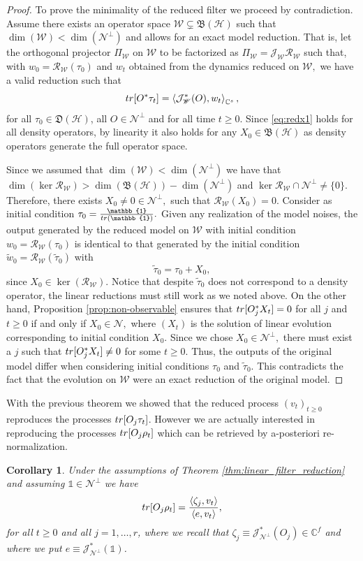 \documentclass[aihp,12pt]{imsart}
\newcommand{\Hc}{\mathcal{H}}
\newcommand{\Jc}{\mathcal{J}}
\newcommand{\Rc}{\mathcal{R}}
\newcommand{\Ns}{\mathscr{N}}
\newcommand{\Ws}{\mathscr{W}}
\newcommand{\Rs}{\mathscr{R}}
\newcommand{\Cb}{\mathbb{C}}
\newcommand{\Bf}{\mathfrak{B}}
\newcommand{\Df}{\mathfrak{D}}
\newcommand{\one}{\mathbb{1}}
\newcommand{\tr}{{\rm tr}}
\newcommand{\inner}[2]{\left< #1,#2 \right>}
\theoremstyle{theorem}
\newtheorem{corollary}{Corollary}
\theoremstyle{definition}
\theoremstyle{remark}
\begin{document}
\begin{proof}
To prove the minimality of the reduced filter we proceed by contradiction. 
Assume there exists an operator space $\Ws\subsetneq\Bf(\Hc)$  such that $\dim(\Ws)<\dim(\Ns^\perp)$ and allows for an exact model reduction. That is, let the orthogonal projector $\Pi_\Ws$ on $\Ws$ to be factorized as $\Pi_\Ws = \Jc_\Ws\Rc_\Ws$ 
such that, with $w_0 = \Rc_{\Ws}(\tau_0)$ and $w_t$ obtained from the dynamics reduced on $\Ws,$ we have a valid reduction such that \begin{equation}\label{eq:redx1}\tr[O^*\tau_t] = \inner{\Jc_\Ws^*(O)}{w_t}_{\Cb^s},\end{equation} for all $\tau_0\in\Df(\Hc)$, all $O\in\Ns^\perp$ and for all time $t\geq0$. Since \eqref{eq:redx1} holds for all density operators, by linearity it also holds for any $X_0\in\Bf(\Hc)$ as density operators generate the full operator space.

Since we assumed that $\dim(\Ws)<\dim(\Ns^\perp)$ we have that $\dim(\ker\Rc_\Ws)>\dim(\Bf(\Hc))-\dim(\Ns^\perp)$ and $\ker\Rs_\Ws\cap\Ns^\perp \neq\{0\}$. Therefore, there exists $X_0\neq 0 \in \Ns^\perp,$  such that $\Rc_{\Ws}(X_0)=0.$
Consider as initial condition $\tau_0=\frac{\one}{\tr{(\one )}}.$ Given any realization of the model noises, the output generated by the reduced model on $\Ws$ with initial condition $w_0=\Rc_\Ws(\tau_0)$ is identical to that generated by the initial condition \(\tilde w_0=\Rc_\Ws(\tilde\tau_0)\) with \[ \tilde\tau_0=\tau_0+X_0,\]
since $X_0\in\ker(\Rc_\Ws).$
Notice that despite $\tilde \tau_0$ does not correspond to a density operator, the linear reductions must still work as we noted above.
On the other hand, Proposition \ref{prop:non-observable}  ensures that $\tr[O_j^* X_t] = 0$ for all $j$ and $t\geq 0$ if and only if $X_0\in \Ns,$ where $(X_t)$ is the solution of linear evolution corresponding to initial condition $X_0$. Since we chose $X_0\in\Ns^\perp,$ there must exist a $j$ such that $\tr[O_j^* X_t]\neq 0$ for some $t\geq 0.$ 
Thus, the outputs of the original model differ when considering  initial conditions $\tau_0$ and $\tilde\tau_0.$ 
This contradicts the fact that the evolution on $\Ws$ were an exact reduction of the original model.
\end{proof}

With the previous theorem we showed that the reduced process $(v_t)_{t\geq0}$ reproduces the processes $\tr[O_j \tau_t]$. However we are actually interested in reproducing the processes $\tr[O_j \rho_t]$ which can be retrieved by a-posteriori re-normalization.
\begin{corollary}
\label{cor:normalization}
    Under the assumptions of Theorem \ref{thm:linear_filter_reduction} and assuming $\one\in\Ns^\perp$ we have  $$\tr[O_j \rho_t] = \frac{\inner{\zeta_j}{v_t}}{\inner{e}{v_t}},$$ for all $t\geq 0$ and all $j=1,\ldots,r$, where we recall that $\zeta_j \equiv \Jc_{\Ns^\perp}^*(O_j)\in\Cb^{f}$ and where we put $e\equiv\Jc_{\Ns^\perp}^*(\one)$.
\end{corollary}
\end{document}
